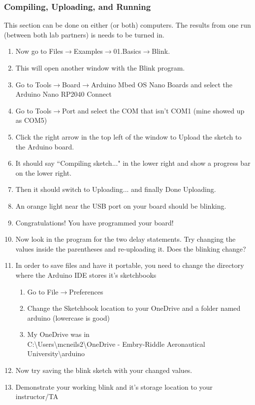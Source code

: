 \subsubsection{Compiling, Uploading, and Running}
This section can be done on either (or both) computers. The results from one run (between both lab partners)
is needs to be turned in.
\begin{enumerate}
	\item Now go to Files$\rightarrow$Examples$\rightarrow$01.Basics$\rightarrow$Blink.
	\item This will open another window with the Blink program.
	\item Go to Tools$\rightarrow$Board$\rightarrow$Arduino Mbed OS Nano Boards and select the Arduino Nano RP2040 Connect
	\item Go to Tools$\rightarrow$Port and select the COM that isn't COM1 (mine showed up as COM5)
	\item Click the right arrow in the top left of the window to Upload the sketch to the Arduino board.
	\item It should say ``Compiling sketch..." in the lower right and show a progress bar on the lower right.
	\item Then it should switch to Uploading... and finally Done Uploading.
	\item An orange light near the USB port on your board should be blinking.
	\item Congratulations! You have programmed your board!
	\item Now look in the program for the two delay statements. Try changing the values inside the 
          parentheses and re-uploading it. Does the blinking change?
	\item In order to save files and have it portable, you need to change the directory where the 
          Arduino IDE stores it's sketchbooks
	\begin{enumerate}
		\item Go to File$\rightarrow$Preferences
		\item Change the Sketchbook location to your OneDrive and a folder named arduino (lowercase is good)
		\item My OneDrive was in \\C:\textbackslash Users\textbackslash mcneils2\textbackslash OneDrive - Embry-Riddle 
		Aeronautical University\textbackslash arduino
	\end{enumerate}
	\item Now try saving the blink sketch with your changed values.
	\item Demonstrate your working blink and it's storage location to your instructor/TA
\end{enumerate}

